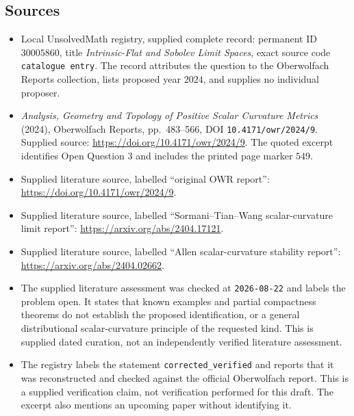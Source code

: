 \documentclass[11pt]{article}
\begin{document}
\subsection{Sources}
\begin{itemize}
\item Local UnsolvedMath registry, supplied complete record: permanent ID \(30005860\), title \emph{Intrinsic-Flat and Sobolev Limit Spaces}, exact source code \texttt{catalogue entry}. The record attributes the question to the Oberwolfach Reports collection, lists proposed year \(2024\), and supplies no individual proposer.
\item \emph{Analysis, Geometry and Topology of Positive Scalar Curvature Metrics} (2024), Oberwolfach Reports, pp.\ 483--566, DOI \texttt{10.4171/owr/2024/9}. Supplied source: \url{https://doi.org/10.4171/owr/2024/9}. The quoted excerpt identifies Open Question 3 and includes the printed page marker \(549\).
\item Supplied literature source, labelled ``original OWR report'': \url{https://doi.org/10.4171/owr/2024/9}.
\item Supplied literature source, labelled ``Sormani--Tian--Wang scalar-curvature limit report'': \url{https://arxiv.org/abs/2404.17121}.
\item Supplied literature source, labelled ``Allen scalar-curvature stability report'': \url{https://arxiv.org/abs/2404.02662}.
\item The supplied literature assessment was checked at \texttt{2026-08-22} and labels the problem open. It states that known examples and partial compactness theorems do not establish the proposed identification, or a general distributional scalar-curvature principle of the requested kind. This is supplied dated curation, not an independently verified literature assessment.
\item The registry labels the statement \texttt{corrected\_verified} and reports that it was reconstructed and checked against the official Oberwolfach report. This is a supplied verification claim, not verification performed for this draft. The excerpt also mentions an upcoming paper without identifying it.
\end{itemize}
\end{document}
